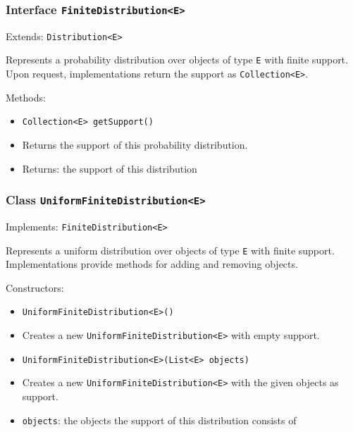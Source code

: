 \documentclass[parskip=full,11pt]{scrartcl}
\begin{document}
\subsubsection{Interface \texttt{FiniteDistribution<E>}}

Extends: \texttt{Distribution<E>}

Represents a probability distribution over objects of type \texttt{E} with finite support. Upon request, implementations return the support as \texttt{Collection<E>}.

Methods:
\begin{itemize}\itemsep -10pt
\item \texttt{Collection<E> getSupport()}
\item[] Returns the support of this probability distribution.
\item[] Returns: the support of this distribution
\end{itemize}

\subsubsection{Class \texttt{UniformFiniteDistribution<E>}}
Implements: \texttt{FiniteDistribution<E>}

Represents a uniform distribution over objects of type \texttt{E} with finite support. Implementations provide methods for adding and removing objects.

Constructors:
\begin{itemize}\itemsep -10pt
\item \texttt{UniformFiniteDistribution<E>()}
\item[] Creates a new \texttt{UniformFiniteDistribution<E>} with empty support.

\item \texttt{UniformFiniteDistribution<E>(List<E> objects)}
\item[] Creates a new \texttt{UniformFiniteDistribution<E>} with the given objects as support.
\item[] \texttt{objects}: the objects the support of this distribution consists of
\end{itemize}
\end{document}
